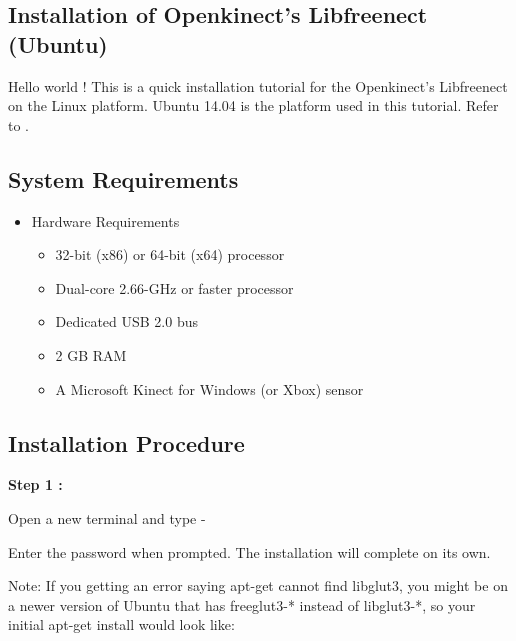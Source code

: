 \begin{flushleft}
\medskip
\section{\textbf{Installation of Openkinect's Libfreenect (Ubuntu)}}
\medskip
Hello world ! This is a quick installation tutorial for the Openkinect's Libfreenect on the Linux platform. Ubuntu 14.04 is the platform used in this tutorial. Refer to \cite{openkinect}.


\subsection{\textbf{ System Requirements}}

\begin{itemize}
\item Hardware Requirements
\medskip
\begin{itemize}
\item 32-bit (x86) or 64-bit (x64) processor
\item Dual-core 2.66-GHz or faster processor
\item Dedicated USB 2.0 bus
\item 2 GB RAM
\item A Microsoft Kinect for Windows (or Xbox) sensor
\end{itemize}
\end{itemize}

\medskip

\subsection{\textbf{ Installation Procedure}}

\textbf{Step 1 :}

\medskip
Open a new terminal and type - 


\medskip

\medskip

Enter the password when prompted. The installation will complete on its own.
\medskip

Note: If you getting an error saying apt-get cannot find libglut3, you might be on a newer version of Ubuntu that has freeglut3-* instead of libglut3-*, so your initial apt-get install would look like: 
\medskip


\end{flushleft}
